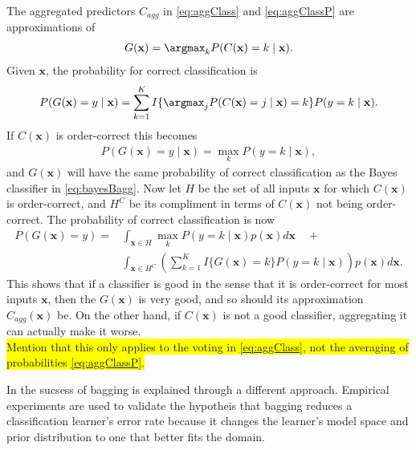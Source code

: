 The aggregated predictors $C_{agg}$ in \eqref{eq:aggClass} and \eqref{eq:aggClassP} are approximations of  
\begin{align}
  G(\mathbf{x}) = \argmax_k P(C(\mathbf{x})=k \mid \mathbf{x}).
\end{align}
Given $\mathbf{x}$, the probability for correct classification is 
\begin{align}
  P(G(\mathbf{x}) = y \mid \mathbf{x})  
  = \sum^{K}_{k=1} I\{ \argmax_j P(C(\mathbf{x}) = j \mid \mathbf{x}) = k \} P(y=k \mid \mathbf{x}).
\end{align}
If $C(\mathbf{x})$ is order-correct this becomes
\begin{align}
  P(G(\mathbf{x}) = y \mid \mathbf{x})  = \max_k P(y = k \mid \mathbf{x}),
\end{align}
and $G(\mathbf{x})$ will have the same probability of correct classification as the Bayes classifier in  \eqref{eq:bayesBagg}. Now let $H$ be the set of all inputs $\mathbf{x}$ for which $C(\mathbf{x})$ is order-correct, and $H^C$ be its compliment in terms of $C(\mathbf{x})$ not being order-correct. The probability of correct classification is now
\begin{align}
  P(G(\mathbf{x}) = y) = &\int_{\mathbf{x} \in H} \max_k P(y=k \mid \mathbf{x})  p(\mathbf{x}) d\mathbf{x} \quad + \\
  &\int_{\mathbf{x} \in H^C} \left(\sum^{K}_{k=1} I\{ G(\mathbf{x}) = k \} P(y=k \mid \mathbf{x})   \right) p(\mathbf{x}) d\mathbf{x}.
\end{align}
This shows that if a classifier is good in the sense that it is order-correct for most inputs $\mathbf{x}$, then the $G(\mathbf{x})$ is very good, and so should its approximation $C_{agg}(\mathbf{x})$ be. On the other hand, if $C(\mathbf{x})$ is not a good classifier, aggregating it can actually make it worse.
\\ \colorbox{yellow}{Mention that this only applies to the voting in \eqref{eq:aggClass}, not the averaging of probabilities \eqref{eq:aggClassP}. }

In \cite{domingos1997Bagging} the sucsess of bagging is explained through a different approach. Empirical experiments are used to validate the hypotheis that  
bagging reduces a classification learner's error rate because it changes the learner's model space and prior distribution to one that better fits the domain.



